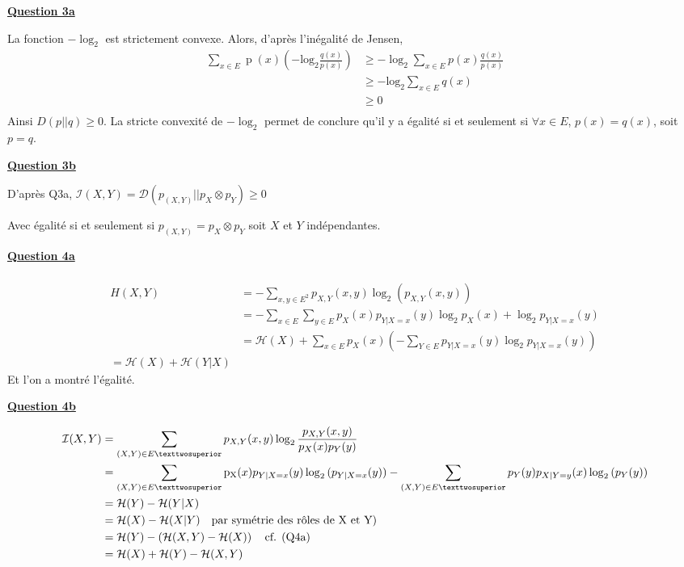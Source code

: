 \documentclass[a4paper,twoside,10pt]{article}
\renewcommand{\H}{\mathcal{H}}
\newcommand{\I}{\mathcal{I}}
\newcommand{\D}{\mathcal{D}}
\newenvironment{Q}[1]{%
\vspace{1ex}
\underline{\textbf{Question #1\\}}
\newline
}{
\vspace{2ex}
}
\begin{document}
\begin{Q}{3a}
La fonction $- \log_2$ est strictement convexe. Alors, d'après l'inégalité de Jensen,
\begin{align*}
\sum_{x \in E} \operatorname{p}(x) \left(
	- \operatorname{log_2}\frac{q(x)}{p(x)}
	\right) &\geq 
		-\log_2{\sum_{x \in E} p(x) \frac{q(x)}{p(x)}} \\
&\geq -\operatorname{log_2} \sum_{x \in E}q(x) \\
&\geq 0 \\
\end{align*}
Ainsi $D(p||q) \geq 0$.
La stricte convexité de $-\log_2$ permet de conclure qu'il y a égalité si et seulement si $\forall x \in E$, $p(x) = q(x)$, soit $p=q$. 
\end{Q}

\begin{Q}{3b}

D'après Q3a, $\I(X,Y) = \D(p_{(X,Y)} || p_X \otimes p_Y) \geq 0$

Avec égalité si et seulement si $p_{(X,Y)} = p_X \otimes p_Y$ soit $X$ et $Y$ indépendantes.
\end{Q}

\begin{Q}{4a}
\begin{align*}
\\H(X,Y) &= - \sum_{x,y \in E^2}  p_{X,Y}(x,y)\log_2{(p_{X,Y}(x,y))} \\
	&= -\sum_{x \in E} \sum_{y \in E} p_X(x) p_{Y|X = x}(y) \log_2{p_X(x)}
		+ \log_2{p_{Y|X= x}(y)} \\
	&= \H(X) + \sum_{x \in E} p_X(x)
		\left(
			-\sum_{Y \in E} p_{Y|X = x}(y) \log_2{p_{Y|X = x}(y)}
		\right) \\
 = \H(X) + \H(Y|X)
\end{align*}
Et l'on a montré l'égalité.
\end{Q} 
 
\begin{Q}{4b}

\begin{align*}
 \I(X,Y) &= \sum_{(X,Y) \in E²} p_{X,Y}(x,y)
				\log_2{\frac{p_{X,Y}{(x,y)}}{p_X(x)p_Y(y)}} \\
	&= \sum_{(X,Y) \in E²}
		\operatorname{p_X}(x) p_{Y|X=x}(y) \log_2{(p_{Y|X=x}(y))} 
 		- \sum_{(X,Y) \in E²}
 			p_Y(y) p_{X|Y=y}(x) \log_2{(p_{Y}(y))} \\
	&= \H(Y) - \H(Y|X) \\
	&= \H(X) - \H(X|Y) \text{\quad par symétrie des rôles de X et Y)} \\
	&= \H(Y) - \left(\H(X,Y) - \H(X)\right) \text{\quad cf. (Q4a)} \\
	&= \H(X) + \H(Y) - \H(X,Y)
\end{align*}
\end{Q}
\end{document}
